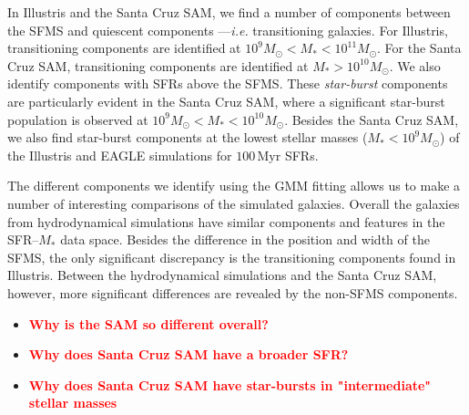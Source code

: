 \documentclass[preprint2,tighten]{aastex62}
\newcommand{\todo}[1]{{\bf \textcolor{red}{ #1}}}
\begin{document}
In Illustris and the Santa Cruz SAM, we find a number of components between 
the SFMS and quiescent components ---\emph{i.e.} transitioning galaxies. 
For Illustris, transitioning components 
are identified at $10^9 M_\odot < M_* < 10^{11}M_\odot$. For the Santa Cruz SAM, 
transitioning components are identified at $M_* > 10^{10} M_\odot$. We also 
identify components with SFRs above the SFMS. These \emph{star-burst} 
components are particularly evident in the Santa Cruz SAM, where a significant
star-burst population is observed at $10^9 M_\odot < M_* < 10^{10} M_\odot$. 
Besides the Santa Cruz SAM, we also find star-burst components at the lowest
stellar masses ($M_* < 10^9 M_\odot$) of the Illustris and EAGLE simulations 
for $100\,\mathrm{Myr}$ SFRs. 

The different components we identify using the GMM fitting allows us to make a 
number of interesting comparisons of the simulated galaxies. Overall
the galaxies from hydrodynamical simulations have similar components
and features in the SFR--$M_*$ data space. Besides the difference in the 
position and width of the SFMS, 
the only significant discrepancy is the transitioning components found in  
Illustris. 
Between the hydrodynamical simulations and the Santa Cruz SAM, however,
more significant differences are revealed by the non-SFMS components. 
\begin{itemize}
    \item \todo{Why is the SAM so different overall?}
    \item \todo{Why does Santa Cruz SAM have a broader SFR?} 
    \item \todo{Why does Santa Cruz SAM have star-bursts in "intermediate" stellar masses}
\end{itemize}
\end{document}
